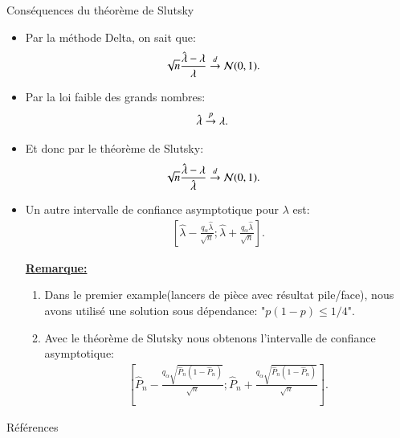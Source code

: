 \begin{frame}
    [allowframebreaks]{Conséquences du théorème de Slutsky}
    \begin{itemize}
        \item Par la méthode Delta, on sait que: \begin{align*}
            \sqrt{n}\frac{\hat{\lambda} - \lambda}{\lambda} &\overset{d}{\rightarrow} \mathcal{N}(0,1).
        \end{align*}
        \item Par la loi faible des grands nombres:\begin{align*}
            \hat{\lambda} &\overset{p}{\rightarrow} \lambda.
        \end{align*}
        \item Et donc par le théorème de Slutsky: \begin{align*}
            \sqrt{n}\frac{\hat{\lambda}-\lambda}{\hat{\lambda}}&\overset{d}{\rightarrow} \mathcal{N}(0,1).
        \end{align*}
        \item Un autre intervalle de confiance asymptotique pour $\lambda$ est: \begin{align*}
            \left[\hat{\lambda}- \frac{q_\alpha\hat{\lambda}}{\sqrt{n}}; 
            \hat{\lambda}+ \frac{q_\alpha\hat{\lambda}}{\sqrt{n}}\right].
        \end{align*}

        \framebreak
        
        \textbf{\underline{Remarque:}}\begin{enumerate}[-]
            \item Dans le premier example(lancers de pièce avec résultat pile/face), nous avons 
            utilisé une solution sous dépendance: "$p(1-p)\leq 1/4$".
            \item Avec le théorème de Slutsky nous obtenons l'intervalle de confiance asymptotique:\begin{align*}
                \left[\hat{P}_n - \frac{q_\alpha\sqrt{\hat{P}_n(1-\hat{P}_n)}}{\sqrt{n}}; 
                \hat{P}_n + \frac{q_\alpha\sqrt{\hat{P}_n(1-\hat{P}_n)}}{\sqrt{n}}
                \right].
            \end{align*}
        \end{enumerate}

    \end{itemize}
    
\end{frame}
\begin{frame}[allowframebreaks]{Références}



\end{frame}

